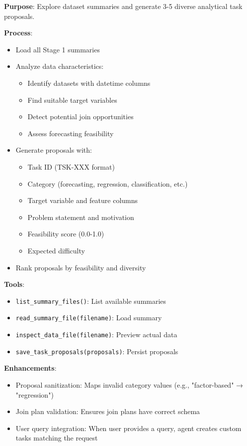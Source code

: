 \documentclass[11pt,a4paper]{article}
\begin{document}
\textbf{Purpose}: Explore dataset summaries and generate 3-5 diverse analytical task proposals.

\textbf{Process}:
\begin{itemize}
    \item Load all Stage 1 summaries
    \item Analyze data characteristics:
    \begin{itemize}
        \item Identify datasets with datetime columns
        \item Find suitable target variables
        \item Detect potential join opportunities
        \item Assess forecasting feasibility
    \end{itemize}
    \item Generate proposals with:
    \begin{itemize}
        \item Task ID (TSK-XXX format)
        \item Category (forecasting, regression, classification, etc.)
        \item Target variable and feature columns
        \item Problem statement and motivation
        \item Feasibility score (0.0-1.0)
        \item Expected difficulty
    \end{itemize}
    \item Rank proposals by feasibility and diversity
\end{itemize}

\textbf{Tools}:
\begin{itemize}
    \item \texttt{list\_summary\_files()}: List available summaries
    \item \texttt{read\_summary\_file(filename)}: Load summary
    \item \texttt{inspect\_data\_file(filename)}: Preview actual data
    \item \texttt{save\_task\_proposals(proposals)}: Persist proposals
\end{itemize}

\textbf{Enhancements}:
\begin{itemize}
    \item Proposal sanitization: Maps invalid category values (e.g., "factor-based" → "regression")
    \item Join plan validation: Ensures join plans have correct schema
    \item User query integration: When user provides a query, agent creates custom tasks matching the request
\end{itemize}
\end{document}
